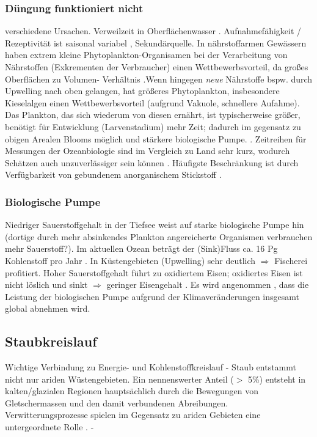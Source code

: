 \documentclass[12pt,a4paper,onecolumn]{scrartcl}
\begin{document}
\subsubsection{Düngung funktioniert nicht}
verschiedene Ursachen. Verweilzeit in Oberflächenwasser \citep{Hayes.2015}. Aufnahmefähigkeit / Rezeptivität ist saisonal variabel \citep{Gabric.2016}, Sekundärquelle. In nährstoffarmen Gewässern haben extrem kleine Phytoplankton-Organisamen bei der Verarbeitung von Nährstoffen (Exkrementen der Verbraucher) einen Wettbewerbsvorteil, da großes Oberflächen zu Volumen- Verhältnis \citep{Falkowski.1998}.Wenn hingegen \textit{neue} Nährstoffe bspw. durch Upwelling nach oben gelangen, hat größeres Phytoplankton, insbesondere Kieselalgen einen Wettbewerbsvorteil (aufgrund Vakuole, schnellere Aufahme). Das Plankton, das sich wiederum von diesen ernährt, ist typischerweise größer, benötigt für Entwicklung (Larvenstadium) mehr Zeit; dadurch im gegensatz zu obigen Arealen Blooms möglich und stärkere biologische Pumpe. \citep{Falkowski.1998}. Zeitreihen für Messungen der Ozeanbiologie sind im Vergleich zu Land sehr kurz, wodurch Schätzen auch unzuverlässiger sein können \citep{Falkowski.1998}. Häufigste Beschränkung ist durch Verfügbarkeit von gebundenem anorganischem Stickstoff \citep{Falkowski.1998}.
\subsubsection{Biologische Pumpe}
Niedriger Sauerstoffgehalt in der Tiefsee weist auf starke biologische Pumpe hin (dortige durch mehr absinkendes Plankton angereicherte Organismen verbrauchen mehr Sauerstoff?). Im aktuellen Ozean beträgt der (Sink)Fluss ca. 16 Pg Kohlenstoff pro Jahr \citep{Falkowski.1998}. In Küstengebieten (Upwelling) sehr deutlich $\Rightarrow$ Fischerei profitiert. Hoher Sauerstoffgehalt führt zu oxidiertem Eisen; oxidiertes Eisen ist nicht löslich und sinkt $\Rightarrow$ geringer Eisengehalt \citep{Falkowski.1998}. Es wird angenommen , dass die Leistung der biologischen Pumpe aufgrund der Klimaveränderungen insgesamt global abnehmen wird.


\subsection{Staubkreislauf}
Wichtige Verbindung zu Energie- und Kohlenstoffkreislauf \citep{Shao.2011} - Staub entstammt nicht nur ariden Wüstengebieten. Ein nennenswerter Anteil ($>$ 5\%) entsteht in kalten/glazialen Regionen hauptsächlich durch die Bewegungen von Gletschermassen und den damit verbundenen Abreibungen. Verwitterungsprozesse spielen im Gegensatz zu ariden Gebieten eine untergeordnete Rolle \citep{Marx.2018}. -
\end{document}

